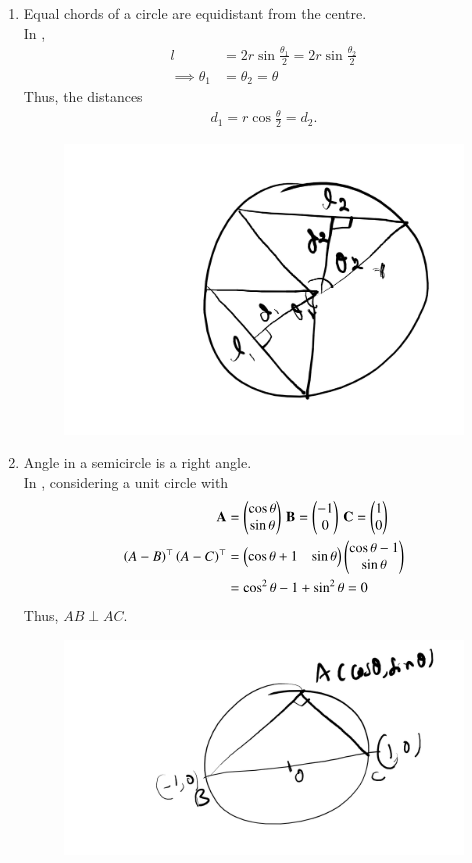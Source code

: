 \begin{enumerate}[label=\thesubsection.\arabic*,ref=\thesubsection.\theenumi]
\item  Equal chords of a circle  are equidistant from the centre.
	\\
		\solution 
	In ,	
\begin{align}
	l &= 2r\sin \frac{\theta_1}{2}
	= 2r\sin \frac{\theta_2}{2}
	\\
	\implies \theta_1 &= \theta_2 = \theta
\end{align}
Thus, the distances
\begin{align}
	d_1 = r \cos \frac{\theta}{2} = d_2.
\end{align}
\begin{figure}[H]
	\begin{center}
		{\includegraphics[width=0.6\columnwidth]{figs/ncert/circle/1.png}}
	\end{center}
	\caption{}
	\label{fig:ncert-circ-1}	
\end{figure}
%
 \item  Angle in a semicircle is a right angle. 
	\\
		\solution 
	In , considering a unit circle	
	with
\begin{align}
	\mathbf{A}&= \begin{pmatrix}\cos \theta \\ \sin \theta\end{pmatrix}\,
	\mathbf{B}= \begin{pmatrix}-1 \\ 0\end{pmatrix}\,
	\mathbf{C}= \begin{pmatrix}1 \\ 0\end{pmatrix}
	\\
	\left(A-B\right)^{\top}
	\left(A-C\right)^{\top}
	&=
	 \begin{pmatrix}\cos \theta+1 & \sin \theta\end{pmatrix}
\begin{pmatrix}\cos \theta -1 \\ \sin \theta\end{pmatrix}
\\
	&=\cos^2\theta -1 + \sin^2\theta = 0
\end{align}
Thus, $AB \perp AC$.
\begin{figure}[H]
	\begin{center}
		{\includegraphics[width=0.6\columnwidth]{figs/ncert/circle/2.png}}

\end{center}
\end{figure}
\end{enumerate}
